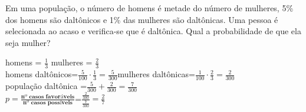\begin{ex}
 Em uma população, o número de homens é metade do número de mulheres, 5\% dos homens são daltônicos e 1\% das mulheres são daltônicas. Uma pessoa é selecionada ao acaso e verifica-se que é daltônica. Qual a probabilidade de que ela seja mulher?
   \begin{sol}
       \phantom{A} 
     homens = $\frac{1}{3}$ \hspace{0.5cm} mulheres = $\frac{2}{3}$\\
     homens daltônicos=$\frac{5}{100}\cdot\frac{1}{3}= \frac{5}{300}$\hspace{0.5cm}mulheres daltônicas=$\frac{1}{100}\cdot\frac{2}{3}=\frac{2}{300}$\\ população daltônica =$\frac{5}{300}+\frac{2}{300}=\frac{7}{300}$\\
     $p=\frac{\textbf{nº casos favoráveis}}{\textbf{nº casos possíveis} }$=$\frac{\frac{2}{300}}{\frac{7}{300}}=\frac{2}{7}$
     
   \end{sol}
\end{ex}